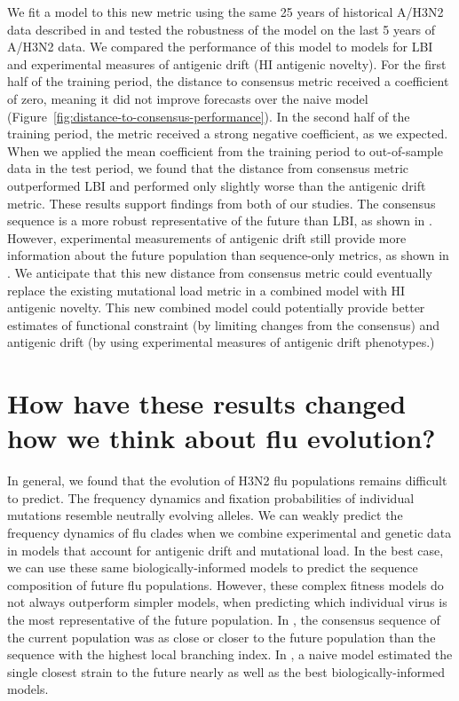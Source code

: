 We fit a model to this new metric using the same 25 years of historical A/H3N2 data described in \citet{Huddleston2020} and tested the robustness of the model on the last 5 years of A/H3N2 data.
We compared the performance of this model to models for LBI and experimental measures of antigenic drift (HI antigenic novelty).
For the first half of the training period, the distance to consensus metric received a coefficient of zero, meaning it did not improve forecasts over the naive model (Figure~\ref{fig:distance-to-consensus-performance}).
In the second half of the training period, the metric received a strong negative coefficient, as we expected.
When we applied the mean coefficient from the training period to out-of-sample data in the test period, we found that the distance from consensus metric outperformed LBI and performed only slightly worse than the antigenic drift metric.
These results support findings from both of our studies.
The consensus sequence is a more robust representative of the future than LBI, as shown in \citet{Barrat-Charlaix2020}.
However, experimental measurements of antigenic drift still provide more information about the future population than sequence-only metrics, as shown in \citet{Huddleston2020}.
We anticipate that this new distance from consensus metric could eventually replace the existing mutational load metric in a combined model with HI antigenic novelty.
This new combined model could potentially provide better estimates of functional constraint (by limiting changes from the consensus) and antigenic drift (by using experimental measures of antigenic drift phenotypes.)

\section{How have these results changed how we think about flu evolution?}

In general, we found that the evolution of H3N2 flu populations remains difficult to predict.
The frequency dynamics and fixation probabilities of individual mutations resemble neutrally evolving alleles.
We can weakly predict the frequency dynamics of flu clades when we combine experimental and genetic data in models that account for antigenic drift and mutational load.
In the best case, we can use these same biologically-informed models to predict the sequence composition of future flu populations.
However, these complex fitness models do not always outperform simpler models, when predicting which individual virus is the most representative of the future population.
In \citet{Barrat-Charlaix2020}, the consensus sequence of the current population was as close or closer to the future population than the sequence with the highest local branching index.
In \citet{Huddleston2020}, a naive model estimated the single closest strain to the future nearly as well as the best biologically-informed models.

